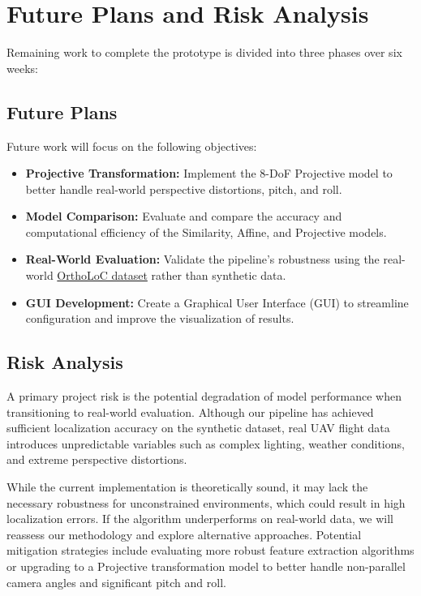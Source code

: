 \section{Future Plans and Risk Analysis}
Remaining work to complete the prototype is divided into three phases over six weeks:

\subsection{Future Plans}\label{subsec:future_plans}
Future work will focus on the following objectives:

\begin{itemize}
    \item \textbf{Projective Transformation:} Implement the 8-DoF Projective model to better handle real-world perspective distortions, pitch, and roll.
    \item \textbf{Model Comparison:} Evaluate and compare the accuracy and computational efficiency of the Similarity, Affine, and Projective models.
    \item \textbf{Real-World Evaluation:} Validate the pipeline's robustness using the real-world \href{https://github.com/deepscenario/OrthoLoC}{OrthoLoC dataset} rather than synthetic data.
    \item \textbf{GUI Development:} Create a Graphical User Interface (GUI) to streamline configuration and improve the visualization of results.
\end{itemize}

\subsection{Risk Analysis}\label{subsec:risk_analysis}
A primary project risk is the potential degradation of model performance when transitioning to real-world evaluation. Although our pipeline has achieved sufficient localization accuracy on the synthetic dataset, real UAV flight data introduces unpredictable variables such as complex lighting, weather conditions, and extreme perspective distortions. 

While the current implementation is theoretically sound, it may lack the necessary robustness for unconstrained environments, which could result in high localization errors. If the algorithm underperforms on real-world data, we will reassess our methodology and explore alternative approaches. Potential mitigation strategies include evaluating more robust feature extraction algorithms or upgrading to a Projective transformation model to better handle non-parallel camera angles and significant pitch and roll.
